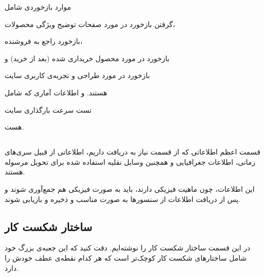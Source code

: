 موارد بازخوردی شامل
\begin{enumerate*}
\item گرفتن بازخورد در مورد صفحات توضیح ویژگی محصولات،
\item بازخورد راجع به فروشنده،
\item بازخورد در مورد محصول خریداری شده (بعد از خرید) و
\item بازخورد در مورد طراحی و تجربه‌ی کاربری سایت
\end{enumerate*} 
هستند. و اطلاعات آماری که شامل
\begin{enumerate*}
\item تست سرعت بارگذاری سایت
\end{enumerate*}
هست.

\subsection{}\label{ssec:shipment}
قسمت اعظم اطلاعاتی که از قسمت 
نیاز به دریافت داریم، اطلاعاتی از قبیل سری‌های زمانی، اطلاعات جغرافیایی و همچنین وسایل نقلیه استفاده شده برای تحویل مرسوله هستند.

این اطلاعات، چون ماهیت فیزیکی دارند، باید به صورت فیزیکی هم جمع‌آوری شوند و پس از دریافت اطلاعات از سنسور‌‌ها به صورت مناسب و  ذخیره و بازیابی شوند.

\subsection{ساختار شکست کار}\label{ssec:data-api-wbs}
در این قسمت ساختار شکست کار‌ را نوشته‌ایم. دقت کنید که این جعبه‌ی بزرگ خود شامل ساختارهای شکست کار کوچک‌تر است که هر کدام نقطه‌ی عطف خودش را دارد.

